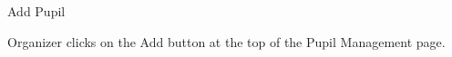 
\begin{uc}{Add Pupil}

    
    \begin{uc-trig}
        Organizer clicks on the Add button at the top of the Pupil Management
        page.
    \end{uc-trig}
\end{uc}


